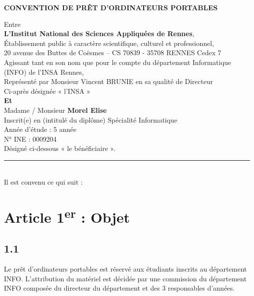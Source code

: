 \documentclass[12pt,a4paper]{article}
\begin{document}
\begin{center}
    \Large \textbf{CONVENTION DE PRÊT D'ORDINATEURS PORTABLES}
\end{center}

\vspace{1cm}

Entre \\
\textbf{L’Institut National des Sciences Appliquées de Rennes},\\
Établissement public à caractère scientifique, culturel et professionnel, \\
20 avenue des Buttes de Coësmes -- CS 70839 - 35708 RENNES Cedex 7 \\

Agissant tant en son nom que pour le compte du département Informatique (INFO) de l’INSA Rennes, \\

Représenté par Monsieur Vincent BRUNIE en sa qualité de Directeur \\

Ci-après désignée « l’INSA » \\

\textbf{Et} \\

Madame / Monsieur \textbf{ Morel Elise } \\
Inscrit(e) en (intitulé du diplôme) Spécialité Informatique \\
Année d’étude : 5 année\\
N° INE : 0009204 \\

Désigné ci-dessous « le bénéficiaire ». \\

\rule{\linewidth}{1pt} \\

Il est convenu ce qui suit :

\section*{Article 1\textsuperscript{er} : Objet}

\subsection*{1.1}
Le prêt d'ordinateurs portables est réservé aux étudiants inscrits au département INFO.  
L'attribution du matériel est décidée par une commission du département INFO composée du directeur du département et des 3 responsables d'années.
\end{document}
